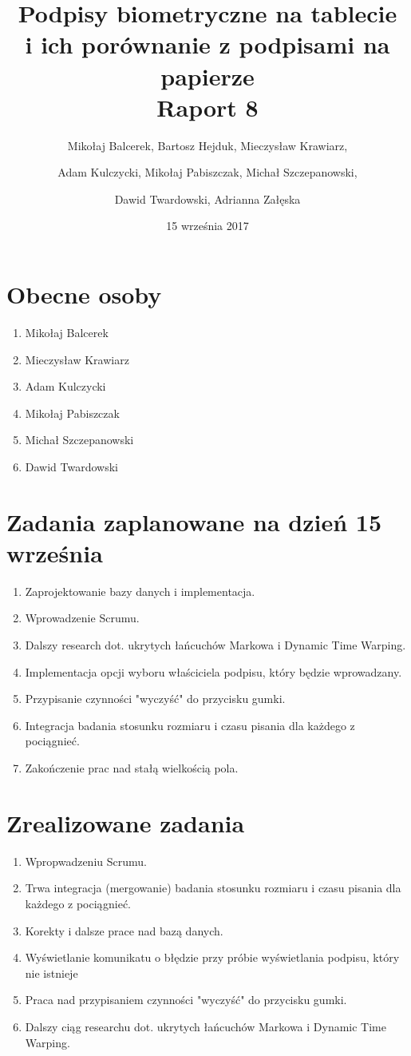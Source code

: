 \documentclass{mwrep}
\title{Podpisy biometryczne na tablecie \\ i ich porównanie z podpisami na papierze\\ 
Raport 8}
\author{Mikołaj Balcerek, Bartosz Hejduk, Mieczysław Krawiarz, \and Adam Kulczycki, Mikołaj Pabiszczak, Michał Szczepanowski, \and Dawid Twardowski, Adrianna Załęska}
\date{15 września 2017}
\begin{document}
\maketitle
{\let\clearpage\relax 
\chapter{Obecne osoby}}
\begin{enumerate}
    \item Mikołaj Balcerek
    \item Mieczysław Krawiarz
    \item Adam Kulczycki
    \item Mikołaj Pabiszczak
    \item Michał Szczepanowski
    \item Dawid Twardowski
\end{enumerate}


{\let\clearpage\relax 
\chapter{Zadania zaplanowane na dzień 15 września}}
\begin{enumerate}
	\item Zaprojektowanie bazy danych i implementacja.
	\item Wprowadzenie Scrumu.
	\item Dalszy research dot. ukrytych łańcuchów Markowa i Dynamic Time Warping.
	\item Implementacja opcji wyboru właściciela podpisu, który będzie wprowadzany.
	\item Przypisanie czynności "wyczyść" do przycisku gumki.
	\item Integracja badania stosunku rozmiaru i czasu pisania dla każdego z pociągnieć.
	\item Zakończenie prac nad stałą wielkością pola.
\end{enumerate}


{\let\clearpage\relax 
\chapter{Zrealizowane zadania}}
\begin{enumerate}
	\item Wpropwadzeniu Scrumu.
	\item Trwa integracja (mergowanie) badania stosunku rozmiaru i czasu pisania dla każdego z pociągnieć.
	\item Korekty i dalsze prace nad bazą danych.
	\item Wyświetlanie komunikatu o błędzie przy próbie wyświetlania podpisu, który nie istnieje
	\item Praca nad przypisaniem czynności "wyczyść" do przycisku gumki.
	\item Dalszy ciąg researchu dot. ukrytych łańcuchów Markowa i Dynamic Time Warping.
	 
	\end{enumerate}
\end{document}
